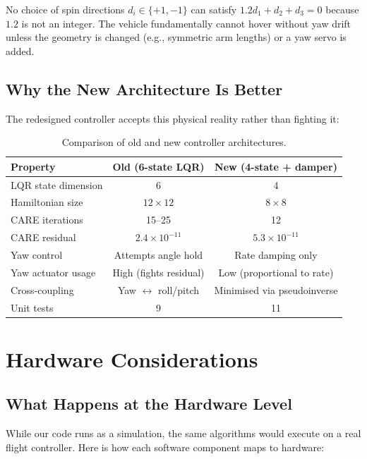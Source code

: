 \documentclass[12pt, a4paper]{article}
\begin{document}
No choice of spin directions $d_i \in \{+1, -1\}$ can satisfy $1.2 d_1 + d_2 + d_3 = 0$ because $1.2$ is not an integer.  The vehicle fundamentally cannot hover without yaw drift unless the geometry is changed (e.g., symmetric arm lengths) or a yaw servo is added.

\subsection{Why the New Architecture Is Better}

The redesigned controller accepts this physical reality rather than fighting it:

\begin{table}[H]
\centering
\small
\begin{tabular}{lcc}
\toprule
\textbf{Property} & \textbf{Old (6-state LQR)} & \textbf{New (4-state + damper)} \\
\midrule
LQR state dimension & 6 & 4 \\
Hamiltonian size & $12 \times 12$ & $8 \times 8$ \\
CARE iterations & 15--25 & 12 \\
CARE residual & $2.4 \times 10^{-11}$ & $5.3 \times 10^{-11}$ \\
Yaw control & Attempts angle hold & Rate damping only \\
Yaw actuator usage & High (fights residual) & Low (proportional to rate) \\
Cross-coupling & Yaw $\leftrightarrow$ roll/pitch & Minimised via pseudoinverse \\
Unit tests & 9 & 11 \\
\bottomrule
\end{tabular}
\caption{Comparison of old and new controller architectures.}
\end{table}

\section{Hardware Considerations}
\label{sec:hardware}

\subsection{What Happens at the Hardware Level}

While our code runs as a simulation, the same algorithms would execute on a real flight controller.  Here is how each software component maps to hardware:
\end{document}
